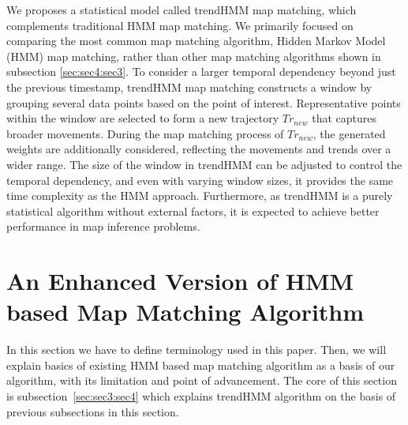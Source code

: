 \documentclass[preprint,12pt]{elsarticle}
\begin{document}
We proposes a statistical model called trendHMM map matching, which complements traditional HMM map matching. 
We primarily focused on comparing the most common map matching algorithm, Hidden Markov Model (HMM) map matching, rather than other map matching algorithms shown in subsection \ref{sec:sec4:sec3}. To consider a larger temporal dependency beyond just the previous timestamp, trendHMM map matching constructs a window by grouping several data points based on the point of interest. Representative points within the window are selected to form a new trajectory $Tr_{new}$ that captures broader movements. During the map matching process of $Tr_{new}$, the generated weights are additionally considered, reflecting the movements and trends over a wider range. The size of the window in trendHMM can be adjusted to control the temporal dependency, and even with varying window sizes, it provides the same time complexity as the HMM approach. Furthermore, as trendHMM is a purely statistical algorithm without external factors, it is expected to achieve better performance in map inference problems.

\section{An Enhanced Version of HMM based Map Matching Algorithm}
\label{sec:sec3}

In this section we have to define terminology used in this paper. Then, we will explain basics of existing HMM based map matching algorithm as a basis of our algorithm, with its limitation and point of advancement. The core of this section is subsection~\ref{sec:sec3:sec4} which explains trendHMM algorithm on the basis of previous subsections in this section.
\end{document}
